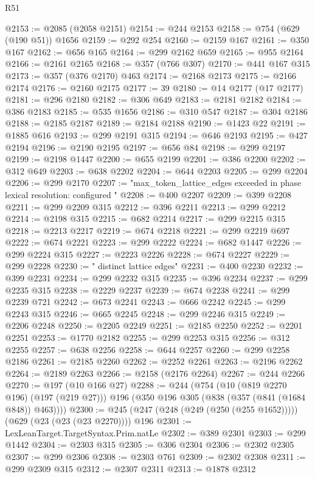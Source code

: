 \begin{lexlean}{R51}
\begin{coremodule}
@2153 := @2085 (@2058 @2151)
@2154 := @244 @2153
@2158 := @754 (@629 (@190 @51)) @1656
@2159 := @292 @254
@2160 := @2159 @167
@2161 := @350 @167
@2162 := @656 @165
@2164 := @299 @2162 @659
@2165 := @955 @2164
@2166 := @2161 @2165
@2168 := @357 (@766 @307)
@2170 := @441 @167 @315
@2173 := @357 (@376 @2170) @463
@2174 := @2168 @2173
@2175 := @2166 @2174
@2176 := @2160 @2175
@2177 := 39
@2180 := @14 @2177 (@17 @2177)
@2181 := @296 @2180
@2182 := @306 @649
@2183 := @2181 @2182
@2184 := @386 @2183
@2185 := @535 @1656
@2186 := @310 @547
@2187 := @304 @2186
@2188 := @2185 @2187
@2189 := @2184 @2188
@2190 := @1423 @22
@2191 := @1885 @616
@2193 := @299 @2191 @315
@2194 := @646 @2193
@2195 := @427 @2194
@2196 := @2190 @2195
@2197 := @656 @84
@2198 := @299 @2197
@2199 := @2198 @1447
@2200 := @655 @2199
@2201 := @386 @2200
@2202 := @312 @649
@2203 := @638 @2202
@2204 := @644 @2203
@2205 := @299 @2204
@2206 := @299 @2170
@2207 := "max_token_lattice_edges exceeded in phase lexical resolution: configured "
@2208 := @400 @2207
@2209 := @399 @2208
@2211 := @299 @2209 @315
@2212 := @396 @2211
@2213 := @299 @2212
@2214 := @2198 @315
@2215 := @682 @2214
@2217 := @299 @2215 @315
@2218 := @2213 @2217
@2219 := @674 @2218
@2221 := @299 @2219 @697
@2222 := @674 @2221
@2223 := @299 @2222
@2224 := @682 @1447
@2226 := @299 @2224 @315
@2227 := @2223 @2226
@2228 := @674 @2227
@2229 := @299 @2228
@2230 := " distinct lattice edges"
@2231 := @400 @2230
@2232 := @399 @2231
@2234 := @299 @2232 @315
@2235 := @396 @2234
@2237 := @299 @2235 @315
@2238 := @2229 @2237
@2239 := @674 @2238
@2241 := @299 @2239 @721
@2242 := @673 @2241
@2243 := @666 @2242
@2245 := @299 @2243 @315
@2246 := @665 @2245
@2248 := @299 @2246 @315
@2249 := @2206 @2248
@2250 := @2205 @2249
@2251 := @2185 @2250
@2252 := @2201 @2251
@2253 := @1770 @2182
@2255 := @299 @2253 @315
@2256 := @312 @2255
@2257 := @638 @2256
@2258 := @644 @2257
@2260 := @299 @2258 @2186
@2261 := @2185 @2260
@2262 := @2252 @2261
@2263 := @2196 @2262
@2264 := @2189 @2263
@2266 := @2158 (@2176 @2264)
@2267 := @244 @2266
@2270 := @197 (@10 @166 @27)
@2288 := @244
    (@754
      (@10 (@819 @2270 @196) (@197 (@219 @27)))
      @196
      (@350 @196 @305 (@838 (@357 (@841 (@1684 @848)) @463))))
@2300 := @245 (@247 (@248 (@249 (@250 (@255 @1652))))) (@629 (@23 (@23 (@23 @2270)))) @196
@2301 := LexLeanTarget.TargetSyntax.Prim.natLe
@2302 := @389 @2301
@2303 := @299 @1442
@2304 := @2303 @315
@2305 := @306 @2304
@2306 := @2302 @2305
@2307 := @299 @2306
@2308 := @2303 @761
@2309 := @2302 @2308
@2311 := @299 @2309 @315
@2312 := @2307 @2311
@2313 := @1878 @2312

\end{coremodule}
\end{lexlean}
